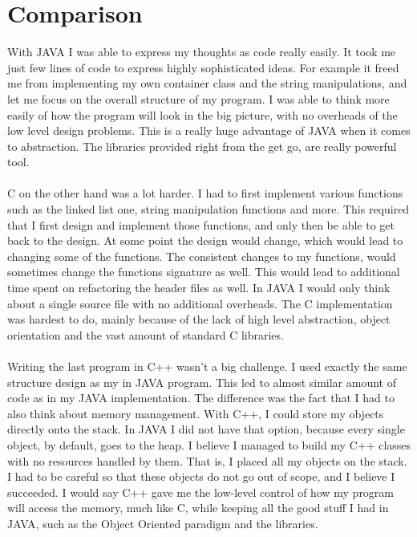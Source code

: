 \documentclass[a4paper]{article}
\begin{document}
\section{Comparison}
With JAVA I was able to express my thoughts as code really easily. It took me just few lines of code to express highly sophisticated ideas. For example it freed me from implementing my own container class and the string manipulations, and let me focus on the overall structure of my program. I was able to think more easily of how the program will look in the big picture, with no overheads of the low level design problems. This is a really huge advantage of JAVA when it comes to abstraction. The libraries provided right from the get go, are really powerful tool. 
\\\\
C on the other hand was a lot harder. I had to first implement various functions such as the linked list one, string manipulation functions and more. This required that I first design and implement those functions, and only then be able to get back to the design. At some point the design would change, which would lead to changing some of the functions. The consistent changes to my functions, would sometimes change the functions signature as well. This would lead to additional time spent on refactoring the header files as well. In JAVA I would only think about a single source file with no additional overheads. The C implementation was hardest to do, mainly because of the lack of high level abstraction, object orientation and the vast amount of standard C libraries.
 \\\\
Writing the last program in C++ wasn't a big challenge. I used exactly the same structure design as my in JAVA program. This led to almost similar amount of code as in my JAVA implementation. The difference was the fact that I had to also think about memory management. With C++, I could store my objects directly onto the stack. In JAVA I did not have that option, because every single object, by default, goes to the heap. I believe I managed to build my C++ classes with no resources handled by them. That is, I placed all my objects on the stack. I had to be careful so that these objects do not go out of scope, and I believe I succeeded. I would say C++ gave me the low-level control of how my program will access the memory, much like C, while keeping all the good stuff I had in JAVA, such as the Object Oriented paradigm and the libraries.
\end{document}
